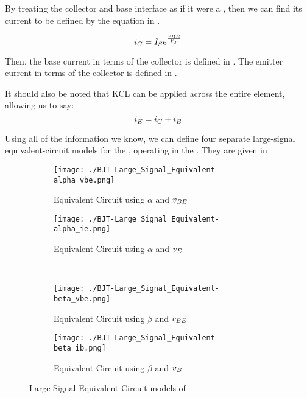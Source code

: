 By treating the collector and base interface as if it were a \PNJunction{}, then we can find its current to be defined by the equation in .

\begin{equation}\label{eq:BJT-Collector_Current}
  i_{C} = I_{S} e^{\frac{v_{BE}}{V_{T}}}
\end{equation}

Then, the base current in terms of the collector is defined in .
The emitter current in terms of the collector is defined in .

It should also be noted that KCL can be applied across the entire element, allowing us to say:
\begin{equation}\label{eq:BJT-KCL}
  i_{E} = i_{C} + i_{B}
\end{equation}

Using all of the information we know, we can define four separate large-signal equivalent-circuit models for the \NPNTransistor{}, operating in the .
They are given in 

\begin{figure}[h!tbp]
  \centering
  \begin{subfigure}{0.48\linewidth}
    \centering
    \texttt{[image: ./BJT-Large\_Signal\_Equivalent-alpha\_vbe.png]}
    \caption{Equivalent Circuit using $\alpha$ and $v_{BE}$}
    \label{fig:BJT-Large_Signal_Equivalent_Circuit-Alpha_VBE}
  \end{subfigure}
  \begin{subfigure}{0.48\linewidth}
    \centering
    \texttt{[image: ./BJT-Large\_Signal\_Equivalent-alpha\_ie.png]}
    \caption{Equivalent Circuit using $\alpha$ and $v_{E}$}
    \label{fig:BJT-Large_Signal_Equivalent_Circuit-Alpha_IE}
  \end{subfigure}
  \\
  \begin{subfigure}{0.48\linewidth}
    \centering
    \texttt{[image: ./BJT-Large\_Signal\_Equivalent-beta\_vbe.png]}
    \caption{Equivalent Circuit using $\beta$ and $v_{BE}$}
    \label{fig:BJT-Large_Signal_Equivalent_Circuit-Beta_VBE}
  \end{subfigure}
  \begin{subfigure}{0.48\linewidth}
    \centering
    \texttt{[image: ./BJT-Large\_Signal\_Equivalent-beta\_ib.png]}
    \caption{Equivalent Circuit using $\beta$ and $v_{B}$}
    \label{fig:BJT-Large_Signal_Equivalent_Circuit-Beta_IB}
  \end{subfigure}
  \caption{Large-Signal Equivalent-Circuit models of \NPNTransistor{} \parencite[p.~313]{sedraTextbook7}}
  \label{fig:BJT-Large_Signal_Equivalent_Circuits}
\end{figure}

